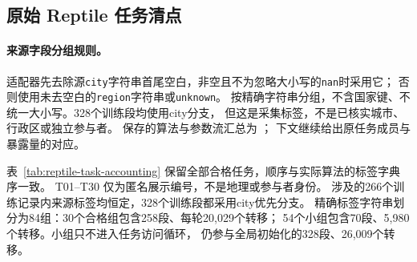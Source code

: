 \documentclass[UTF8,11pt]{ctexart}
\begin{document}
\subsection{原始 Reptile 任务清点}
\label{sec:reptile-task-accounting}
\paragraph{来源字段分组规则。}
适配器先去除源\texttt{city}字符串首尾空白，非空且不为忽略大小写的\texttt{nan}时采用它；
否则使用未去空白的\texttt{region}字符串或\texttt{unknown}。
按精确字符串分组，不含国家键、不统一大小写。328个训练段均使用city分支，
但这是采集标签，不是已核实城市、行政区或独立参与者。
保存的算法与参数流汇总为
；
下文继续给出原任务成员与暴露量的对应。

表~\ref{tab:reptile-task-accounting} 保留全部合格任务，顺序与实际算法的标签字典序一致。
T01--T30 仅为匿名展示编号，不是地理或参与者身份。
涉及的266个训练记录内来源标签均恒定，328个训练段都采用city优先分支。
精确标签字符串划分为84组：30个合格组包含258段、每轮20,029个转移；
54个小组包含70段、5,980个转移。小组只不进入任务访问循环，
仍参与全局初始化的328段、26,009个转移。
\end{document}
